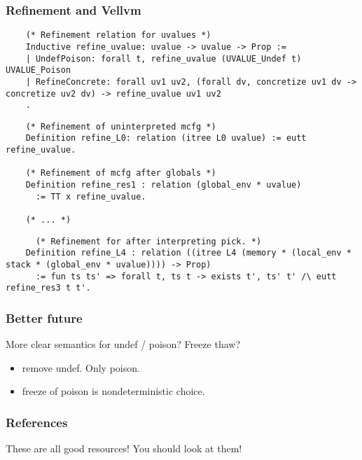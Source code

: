 \documentclass{beamer}
\begin{document}
\begin{frame}[fragile]
  \frametitle{Refinement and Vellvm}

\begin{lstlisting}
    (* Refinement relation for uvalues *)
    Inductive refine_uvalue: uvalue -> uvalue -> Prop :=
    | UndefPoison: forall t, refine_uvalue (UVALUE_Undef t) UVALUE_Poison
    | RefineConcrete: forall uv1 uv2, (forall dv, concretize uv1 dv -> concretize uv2 dv) -> refine_uvalue uv1 uv2
    .
\end{lstlisting}

  \pause
  
\begin{lstlisting}
    (* Refinement of uninterpreted mcfg *)
    Definition refine_L0: relation (itree L0 uvalue) := eutt refine_uvalue.

    (* Refinement of mcfg after globals *)
    Definition refine_res1 : relation (global_env * uvalue)
      := TT x refine_uvalue.

    (* ... *)
\end{lstlisting}

  \pause

\begin{lstlisting}
      (* Refinement for after interpreting pick. *)
    Definition refine_L4 : relation ((itree L4 (memory * (local_env * stack * (global_env * uvalue)))) -> Prop)
      := fun ts ts' => forall t, ts t -> exists t', ts' t' /\ eutt refine_res3 t t'.
\end{lstlisting}

\end{frame}

\begin{frame}[allowframebreaks]
  \frametitle{Better future}

  More clear semantics for undef / poison? Freeze thaw?

  \begin{itemize}
  \item remove undef. Only poison.
  \item freeze of poison is nondeterministic choice.
  \end{itemize}
\end{frame}

  \begin{frame}
    \frametitle{References}

  \nocite{*}
  \printbibliography

  These are all good resources! You should look at them!
\end{frame}
\end{document}
